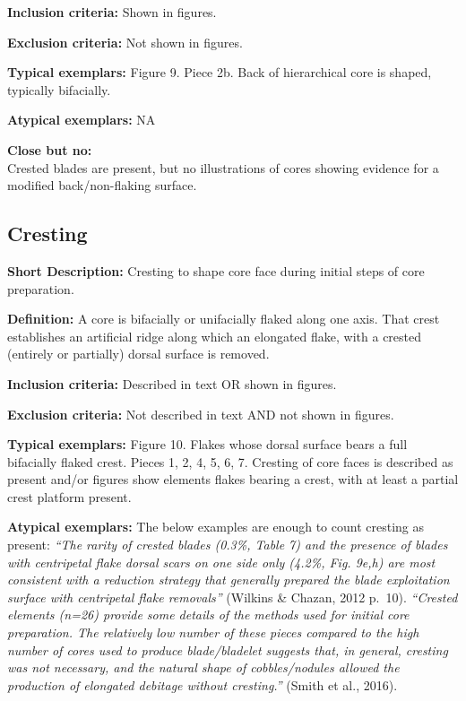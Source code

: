 \documentclass[
]{article}
\begin{document}
\textbf{Inclusion criteria:} Shown in figures.

\textbf{Exclusion criteria:} Not shown in figures.

\textbf{Typical exemplars:} Figure 9. Piece 2b. Back of hierarchical
core is shaped, typically bifacially.

\textbf{Atypical exemplars:} NA

\textbf{Close but no:}\\
Crested blades are present, but no illustrations of cores showing
evidence for a modified back/non-flaking surface.

\subsection{Cresting}\label{cresting}

\textbf{Short Description:} Cresting to shape core face during initial
steps of core preparation.

\textbf{Definition:} A core is bifacially or unifacially flaked along
one axis. That crest establishes an artificial ridge along which an
elongated flake, with a crested (entirely or partially) dorsal surface
is removed.

\textbf{Inclusion criteria:} Described in text OR shown in figures.

\textbf{Exclusion criteria:} Not described in text AND not shown in
figures.

\textbf{Typical exemplars:} Figure 10. Flakes whose dorsal surface bears
a full bifacially flaked crest. Pieces 1, 2, 4, 5, 6, 7. Cresting of
core faces is described as present and/or figures show elements flakes
bearing a crest, with at least a partial crest platform present.

\textbf{Atypical exemplars:} The below examples are enough to count
cresting as present: \emph{``The rarity of crested blades (0.3\%, Table
7) and the presence of blades with centripetal flake dorsal scars on one
side only (4.2\%, Fig. 9e,h) are most consistent with a reduction
strategy that generally prepared the blade exploitation surface with
centripetal flake removals''} (Wilkins \& Chazan, 2012 p.~10).
\emph{``Crested elements (n=26) provide some details of the methods used
for initial core preparation. The relatively low number of these pieces
compared to the high number of cores used to produce blade/bladelet
suggests that, in general, cresting was not necessary, and the natural
shape of cobbles/nodules allowed the production of elongated debitage
without cresting.''} (Smith et al., 2016).
\end{document}
